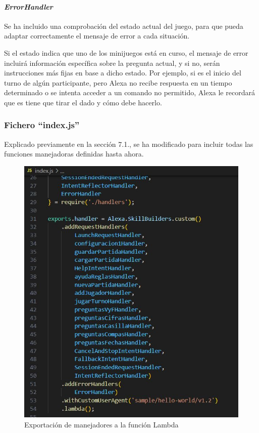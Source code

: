 \paragraph{\textit{ErrorHandler}}

Se ha incluido una comprobación del estado actual del juego, para que pueda adaptar correctamente el mensaje de error a cada situación.

Si el estado indica que uno de los minijuegos está en curso, el mensaje de error incluirá información específica sobre la pregunta actual, y si no, serán instrucciones más fijas en base a dicho estado. Por ejemplo, si es el inicio del turno de algún participante, pero Alexa no recibe respuesta en un tiempo determinado o se intenta acceder a un comando no permitido, Alexa le recordará que es tiene que tirar el dado y cómo debe hacerlo.

\subsubsection{Fichero \enquote{index.js}}

Explicado previamente en la sección 7.1., se ha modificado para incluir todas las funciones manejadoras definidas hasta ahora.

\begin{figure}[H]
	\centering
	\includegraphics{imgs/codigo-index.jpg}
	\caption{Exportación de manejadores a la función Lambda}
	\label{fig:codigo-index}
\end{figure}

